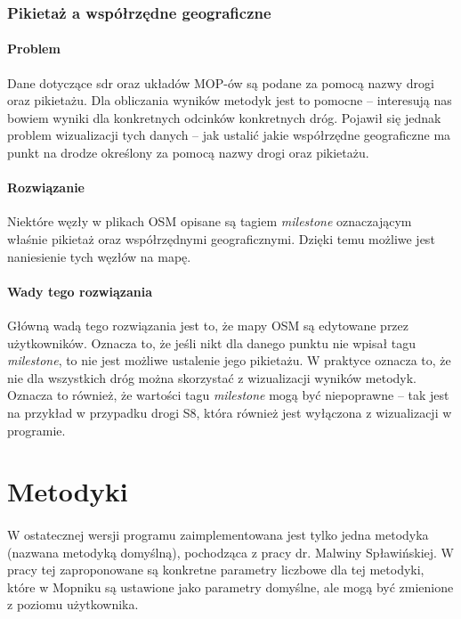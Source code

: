 \subsubsection{Pikietaż a współrzędne geograficzne}
\paragraph{Problem} Dane dotyczące \acrshort{sdr} oraz układów MOP-ów są podane
za pomocą nazwy drogi oraz pikietażu. Dla obliczania wyników metodyk jest to
pomocne -- interesują nas bowiem wyniki dla konkretnych odcinków konkretnych
dróg. Pojawił się jednak problem wizualizacji tych danych -- jak ustalić jakie
współrzędne geograficzne ma punkt na drodze określony za pomocą nazwy drogi
oraz pikietażu.
\paragraph{Rozwiązanie} Niektóre węzły w plikach OSM opisane są tagiem
\textit{milestone} oznaczającym
właśnie pikietaż oraz współrzędnymi geograficznymi. Dzięki temu możliwe jest
naniesienie tych węzłów na mapę.
\paragraph{Wady tego rozwiązania}
Główną wadą tego rozwiązania jest to, że mapy OSM są edytowane przez
użytkowników. Oznacza to, że jeśli nikt dla danego punktu nie wpisał tagu
\textit{milestone}, to nie jest możliwe ustalenie jego pikietażu. W
praktyce oznacza to, że nie dla wszystkich dróg można skorzystać z wizualizacji
wyników metodyk. Oznacza to również, że wartości tagu \textit{milestone} mogą być
niepoprawne -- tak jest na przykład w przypadku drogi S8, która również jest
wyłączona z wizualizacji w programie.


\section{Metodyki}
\paragraph{}
W ostatecznej wersji programu zaimplementowana jest tylko jedna metodyka
(nazwana metodyką domyślną),
pochodząca z pracy dr. Malwiny Spławińskiej\cite{metodyki}.
W pracy tej zaproponowane są konkretne parametry liczbowe dla tej metodyki,
które w Mopniku są ustawione jako parametry domyślne, ale mogą być zmienione
z poziomu użytkownika.
